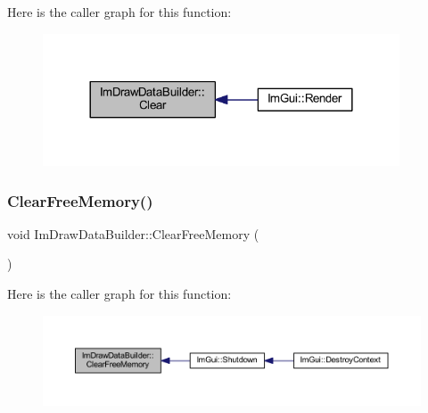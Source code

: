Here is the caller graph for this function\+:
\nopagebreak
\begin{figure}[H]
\begin{center}
\leavevmode
\includegraphics[width=300pt]{struct_im_draw_data_builder_a5306e78438b48a74f2d65d0e10d36d53_icgraph}
\end{center}
\end{figure}
\mbox{\label{struct_im_draw_data_builder_a469040fce189f1225043171a3b58420d}} 
\subsubsection{\texorpdfstring{Clear\+Free\+Memory()}{ClearFreeMemory()}}
{\footnotesize\ttfamily void Im\+Draw\+Data\+Builder\+::\+Clear\+Free\+Memory (\begin{DoxyParamCaption}{ }\end{DoxyParamCaption})\hspace{0.3cm}{\ttfamily [inline]}}

Here is the caller graph for this function\+:
\nopagebreak
\begin{figure}[H]
\begin{center}
\leavevmode
\includegraphics[width=350pt]{struct_im_draw_data_builder_a469040fce189f1225043171a3b58420d_icgraph}
\end{center}
\end{figure}
\mbox{\label{struct_im_draw_data_builder_a3893445f97c62e9755fa61e37b698487}} 
